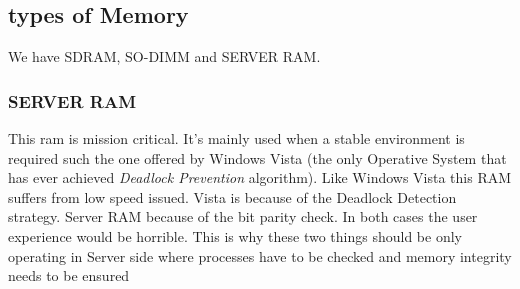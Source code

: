 \documentclass[a4paper,12pt]{article}
\begin{document}
\subsection{types of Memory}

We have SDRAM, SO-DIMM and SERVER RAM.

\subsubsection{SERVER RAM}
This ram is mission critical. It's mainly used when a stable environment is required such the one offered by Windows Vista (the only Operative System that has ever achieved \emph{Deadlock Prevention} algorithm).
Like Windows Vista this RAM suffers from low speed issued. Vista is because of the Deadlock Detection strategy. Server RAM because of the bit parity check. In both cases the user experience would be horrible. This is why these two things should be only operating in Server side where processes have to be checked and memory integrity needs to be ensured




\printindex
\end{document}
